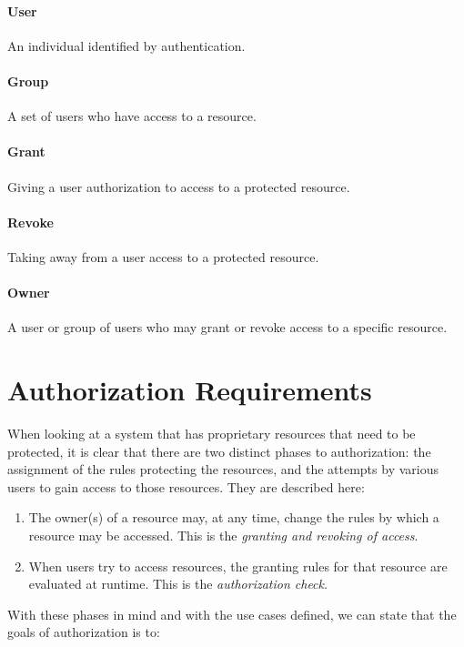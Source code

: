 \documentclass[11pt,a4paper]{ivoa}
\begin{document}
\paragraph{User} An individual identified by authentication.

\paragraph{Group} A set of users who have access to a resource.

\paragraph{Grant} Giving a user authorization to access to a protected resource.

\paragraph{Revoke} Taking away from a user access to a protected resource.

\paragraph{Owner} A user or group of users who may grant or revoke access to a specific resource.

\section{Authorization Requirements}

When looking at a system that has proprietary resources that need to be protected, it is clear that there are two distinct phases to authorization:  the assignment of the rules protecting the resources, and the attempts by various users to gain access to those resources.  They are described here:

\begin{enumerate}
\item The owner(s) of a resource may, at any time, change the rules by which a resource may be accessed. This is the \emph{granting and revoking of access}.
\item When users try to access resources, the granting rules for that resource are evaluated at runtime. This is the \emph{authorization check}.
\end{enumerate}

With these phases in mind and with the use cases defined, we can state that the goals of authorization is to:
\end{document}
